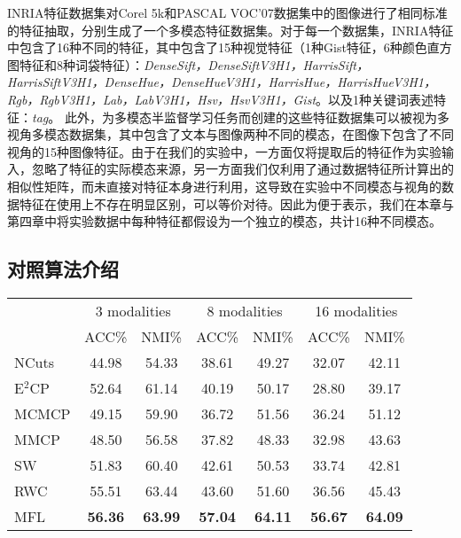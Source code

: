 INRIA特征数据集\cite{guillaumin2009tagprop}对Corel 5k和PASCAL VOC'07数据集中的图像进行了相同标准的特征抽取，分别生成了一个多模态特征数据集。对于每一个数据集，INRIA特征中包含了16种不同的特征，其中包含了15种视觉特征（1种Gist特征，6种颜色直方图特征和8种词袋特征）：\textit{DenseSift，DenseSiftV3H1，HarrisSift，HarrisSiftV3H1，DenseHue，DenseHueV3H1，HarrisHue，HarrisHueV3H1，Rgb，RgbV3H1，Lab，LabV3H1，Hsv，HsvV3H1，Gist}。以及1种关键词表述特征：\textit{tag}。
此外，为多模态半监督学习任务而创建的这些特征数据集可以被视为多视角多模态数据集，其中包含了文本与图像两种不同的模态，在图像下包含了不同视角的15种图像特征。由于在我们的实验中，一方面仅将提取后的特征作为实验输入，忽略了特征的实际模态来源，另一方面我们仅利用了通过数据特征所计算出的相似性矩阵，而未直接对特征本身进行利用，这导致在实验中不同模态与视角的数据特征在使用上不存在明显区别，可以等价对待。因此为便于表示，我们在本章与第四章中将实验数据中每种特征都假设为一个独立的模态，共计16种不同模态。

\subsection{对照算法介绍}

\begin{table}[t]
	\label{tab3:modal_corel}
	\centering
	\setlength{\tabcolsep}{8pt}
	\begin{tabular}{l*{6}{c}}
		\toprule
		&\multicolumn{2}{c}{3 modalities} & \multicolumn{2}{c}{8 modalities} & \multicolumn{2}{c}{16 modalities} \\
		\cmidrule(lr){2-3}
		\cmidrule(lr){4-5}
		\cmidrule(lr){6-7}
		& ACC\% & NMI\% & ACC\% & NMI\% & ACC\% & NMI\% \\
		\midrule
		NCuts\cite{shi2000normalized} & 44.98 & 54.33 & 38.61 & 49.27 & 32.07 & 42.11 \\ 
		E$^2$CP\cite{lu2010constrained} & 52.64 & 61.14 & 40.19 & 50.17 & 28.80 & 39.17 \\ 
		MCMCP\cite{fu2012modalities} & 49.15 & 59.90 & 36.72 & 51.56 & 36.24 & 51.12 \\ 
		MMCP\cite{fu2011multi} & 48.50 & 56.58 & 37.82 & 48.33 & 32.98 & 43.63 \\ 
		\midrule
		SW & 51.83 & 60.40 & 42.61 & 50.53 & 33.74 & 42.81 \\
		RWC & 55.51 & 63.44 & 43.60 & 51.60 & 36.56 & 45.43 \\
		MFL & \textbf{56.36} & \textbf{63.99} & \textbf{57.04} & \textbf{64.11} & \textbf{56.67} &\textbf{ 64.09} \\
		\bottomrule
	\end{tabular}
\end{table}

